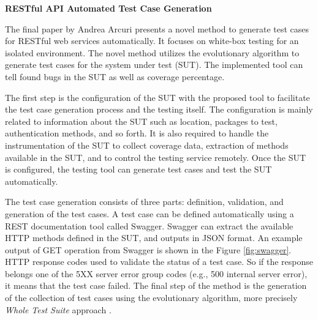 \documentclass[english]{tktltiki}
\begin{document}
\textbf{RESTful API Automated Test Case Generation}

The final paper by Andrea Arcuri \cite{arcuri2017restful} presents a novel method to generate test cases for RESTful web services automatically. It focuses on white-box testing for an isolated environment. The novel method utilizes the evolutionary algorithm to generate test cases for the system under test (SUT). The implemented tool can tell found bugs in the SUT as well as coverage percentage.

The first step is the configuration of the SUT with the proposed tool to facilitate the test case generation process and the testing itself. The configuration is mainly related to information about the SUT such as location, packages to test, authentication methods, and so forth. It is also required to handle the instrumentation of the SUT to collect coverage data, extraction of methods available in the SUT, and to control the testing service remotely. Once the SUT is configured, the testing tool can generate test cases and test the SUT automatically.

The test case generation consists of three parts: definition, validation, and generation of the test cases. A test case can be defined automatically using a REST documentation tool called Swagger. Swagger can extract the available HTTP methods defined in the SUT, and outputs in JSON format. An example output of GET operation from Swagger is shown in the Figure \ref{fig:swagger}. HTTP response codes used to validate the status of a test case. So if the response belongs one of the 5XX server error group codes (e.g., 500 internal server error), it means that the test case failed. The final step of the method is the generation of the collection of test cases using the evolutionary algorithm, more precisely \textit{Whole Test Suite} approach \cite{fraser2013whole}.
\end{document}
